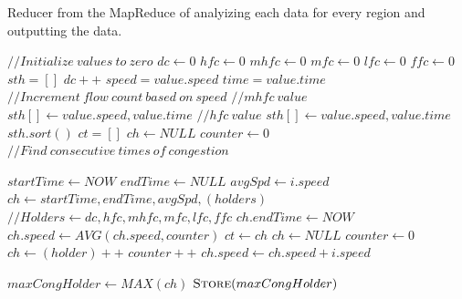 \documentclass[titlepage,twocolumn]{article}
\begin{document}
\begin{algorithm}
	\small
	\caption{\small Reducer from the MapReduce of analyizing each data for every region and outputting the data.}
	\label{alg:3}
	\begin{algorithmic}[1]
		\State $ // Initialize\ values\ to\ zero $
		\State $ dc \gets 0 $  
		\State $ hfc \gets 0 $ 
		\State $ mhfc \gets 0 $  
		\State $ mfc \gets 0 $ 
		\State $ lfc \gets 0 $ 
		\State $ ffc \gets 0 $ 
		\State $ sth = [] $ 
			\State $ dc++ $
			\State $ speed = value.speed $
			\State $ time = value.time $
			\State $ // Increment\ flow\ count\ based\ on\ speed $
				\State $ // mhfc\ value $
				\State $ sth[] \gets value.speed, value.time$
			\EndIf
				\State $ // hfc\ value $
				\State $ sth[] \gets value.speed, value.time $
			\EndIf
		\EndFor
		\State $ sth.sort() $ 
		\State $ ct = [] $ 
		\State $ ch \gets NULL $ 
		\State $ counter \gets 0 $ 
			\State $ // Find\ consecutive\ times\ of\ congestion  $

				\State $ startTime \gets NOW $
				\State $ endTime \gets NULL $
				\State $ avgSpd \gets i.speed $
				\State $ ch \gets startTime,endTime, avgSpd, (holders) $
				\State $ // Holders \gets dc,hfc,mhfc,mfc,lfc,ffc $
			\EndIf
				\State $ ch.endTime \gets NOW $
				\State $ ch.speed \gets  AVG(ch.speed, counter)$
				\State $ ct \gets ch $
				\State $ ch \gets NULL $ 
				\State $ counter \gets 0 $ 
			\EndIf
				\State $ ch \gets (holder)++ $
				\State $ counter++ $
				\State $ ch.speed \gets ch.speed + i.speed $
			\EndIf
		\EndFor
		
		\State $ maxCongHolder \gets MAX(ch) $
		\State $ \Call{Store}{maxCongHolder} $
		\EndProcedure
	\end{algorithmic}
\end{algorithm}
\end{document}

